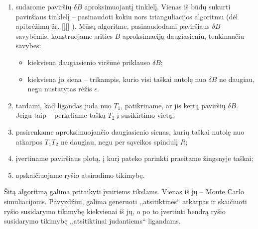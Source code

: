 \documentclass[10pt]{article}
\begin{document}
\begin{enumerate}
\item sudarome paviršių $ \delta B $ aproksimuojantį tinklelį. Vienas iš būdų sukurti paviršiaus tinklelį -- pasinaudoti kokiu nors trianguliacijos algoritmu (dėl apibrėžimų žr. [][] ). Mūsų algoritme, pasinaudodami paviršiaus $ \delta B $ savybėmis, konstruojame   srities $ B $ aproksimaciją daugiasieniu, tenkinančiu savybes:
\begin{itemize}

\item kiekviena daugiasienio viršūnė priklauso $ \delta B $;

\item kiekviena jo siena -- trikampis, kurio visi taškai nutolę nuo $ \delta B $ ne daugiau, negu nustatytas rėžis $ \epsilon $.

\end{itemize}

\item tardami, kad ligandas juda nuo $ T_1 $, patikriname, ar jis kertą paviršių $ \delta B $. Jeigu taip -- perkeliame tašką $ T_2 $ į susikirtimo vietą;

\item pasirenkame aproksimuojančio daugiasienio sienas, kurių taškai nutolę nuo atkarpos $ T_{1}T_{2} $ ne daugiau, negu per sąveikos spindulį $ R $;

\item įvertiname paviršiaus plotą, į kurį pateko parinkti praeitame žingsnyje taškai;

\item apskaičiuojame ryšio atsiradimo tikimybę.
   
\end{enumerate}



Šitą algoritmą galima pritaikyti įvairiems tikslams. Vienas iš jų -- Monte Carlo simuliacijoms. Pavyzdžiui, galima generuoti ,,atsitiktines`` atkarpas ir skaičiuoti ryšio susidarymo tikimybę kiekvienai iš jų, o po to įvertinti bendrą ryšio susidarymo tikimybę ,,atsitiktinai judantiems`` ligandams.
\end{document}
